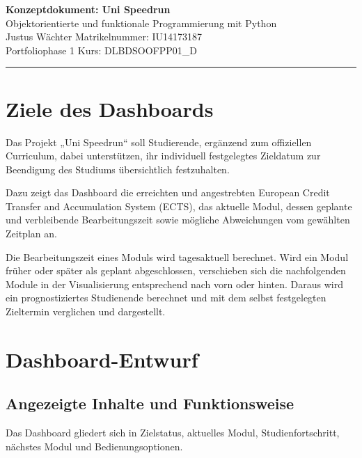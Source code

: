 \documentclass[11pt,a4paper]{article}
\newcommand{\projektname}{Uni Speedrun}
\newcommand{\matrikelnummer}{IU14173187}
\newcommand{\kurs}{DLBDSOOFPP01\_D}
\begin{document}

\begin{center}
    {\Large\textbf{Konzeptdokument: \projektname}}\\[3pt]
    {\large Objektorientierte und funktionale Programmierung mit Python}\\[6pt]

    Justus Wächter \hfill Matrikelnummer: \matrikelnummer\\
    Portfoliophase 1 \hfill Kurs: \kurs
\end{center}

\hrule
\vspace{0.4cm}

\section{Ziele des Dashboards}
Das Projekt „Uni Speedrun“ soll Studierende, ergänzend zum offiziellen Curriculum, dabei unterstützen, ihr individuell festgelegtes Zieldatum zur Beendigung des Studiums übersichtlich festzuhalten.

Dazu zeigt das Dashboard die erreichten und angestrebten European Credit Transfer and Accumulation System (ECTS), das aktuelle Modul, dessen geplante und verbleibende Bearbeitungszeit sowie mögliche Abweichungen vom gewählten Zeitplan an.

Die Bearbeitungszeit eines Moduls wird tagesaktuell berechnet. Wird ein Modul früher oder später als geplant abgeschlossen, verschieben sich die nachfolgenden Module in der Visualisierung entsprechend nach vorn oder hinten. Daraus wird ein prognostiziertes Studienende berechnet und mit dem selbst festgelegten Zieltermin verglichen und dargestellt.

\section{Dashboard-Entwurf}

\subsection{Angezeigte Inhalte und Funktionsweise}

Das Dashboard gliedert sich in Zielstatus, aktuelles Modul, Studienfortschritt, nächstes Modul und Bedienungsoptionen.
\end{document}
